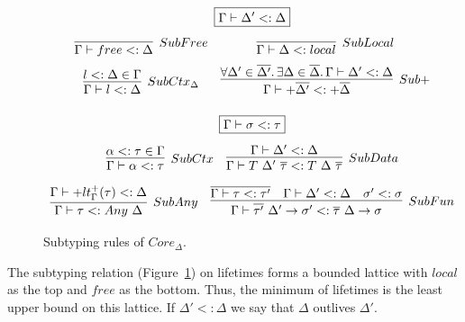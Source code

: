 \documentclass[11pt]{article}
\newcommand{\mathframebox}[1]{\framebox{$\displaystyle #1$}}
\newcommand{\ap}{~}
\begin{document}
    \begin{figure}
        \begin{gather*}
            \mathframebox{\Gamma\vdash\Delta' <: \Delta} \\[0.5em]
            \begin{array}{cc}
                \infer[SubFree]{\Gamma\vdash free <: \Delta}{} &
                \infer[SubLocal]{\Gamma\vdash\Delta <: local}{} \\[0.5em]
                \infer[SubCtx_\Delta]{
                    \Gamma\vdash l <: \Delta
                }{
                    l <: \Delta \in \Gamma
                } &
                \infer[Sub+]{
                    \Gamma\vdash+\overline{\Delta'} <: +\overline{\Delta}
                }{
                    \forall\Delta'\in\overline{\Delta'}\ldotp\exists\Delta\in\overline{\Delta}\ldotp \Gamma\vdash\Delta' <: \Delta
                }
            \end{array}\\[1em]
            \mathframebox{\Gamma\vdash \sigma <: \tau} \\[0.5em]
            \begin{array}{cc}
                \infer[SubCtx]{\Gamma\vdash \alpha <: \tau}{\alpha <: \tau \in \Gamma} &
                \infer[SubData]{
                    \Gamma\vdash T\ap\Delta'\ap\overline{\tau} <: T\ap\Delta\ap\overline{\tau}
                }{
                    \Gamma\vdash\Delta' <: \Delta
                }
            \end{array} \\[0.5em]
            \begin{array}{cc}
                \infer[SubAny]{
                    \Gamma\vdash \tau <: Any\ap\Delta
                }{
                    \Gamma\vdash +lt_\Gamma^+(\tau) <: \Delta
                } &
                \infer[SubFun]{
                    \Gamma\vdash\overline{\tau'}~\Delta'\to\sigma' <: \overline{\tau}~\Delta\to\sigma
                }{
                    \overline{\Gamma\vdash\tau <: \tau'} &
                    \Gamma\vdash\Delta' <: \Delta &
                    \sigma' <: \sigma
                }
            \end{array}
        \end{gather*}
        \caption{Subtyping rules of $Core_{\Delta}$.}
        \label{fig:core-subtyping}
    \end{figure}

    The subtyping relation (Figure\ \ref{fig:core-subtyping}) on lifetimes forms a bounded lattice with $local$ as the top and $free$ as the bottom.
    Thus, the minimum of lifetimes is the least upper bound on this lattice.
    If $\Delta' <: \Delta$ we say that $\Delta$ outlives $\Delta'$.
\end{document}
